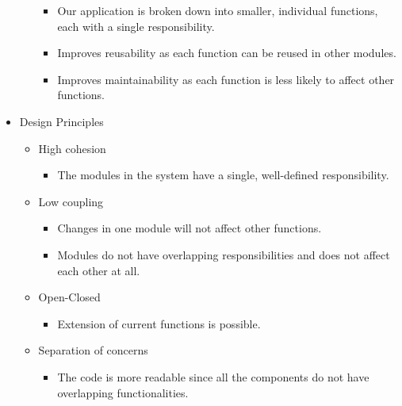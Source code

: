 \documentclass[a4paper]{scrreprt}
\begin{document}
\begin{itemize}
\begin{itemize}
\begin{itemize}
            \item Our application is broken down into smaller, individual functions, each with a single responsibility.
            \item Improves reusability as each function can be reused in other modules.
            \item Improves maintainability as each function is less likely to affect other functions.
        \end{itemize}
    \end{itemize}
    \item Design Principles
    \begin{itemize}
        \item High cohesion
        \begin{itemize}
            \item The modules in the system have a single, well-defined responsibility.
        \end{itemize}
        \item Low coupling
        \begin{itemize}
            \item Changes in one module will not affect other functions.
            \item Modules do not have overlapping responsibilities and does not affect each other at all.
        \end{itemize}
        \item Open-Closed
        \begin{itemize}
            \item Extension of current functions is possible.
        \end{itemize}
        \item Separation of concerns
        \begin{itemize}
            \item The code is more readable since all the components do not have overlapping functionalities.
        \end{itemize}
    \end{itemize}
\end{itemize}
\end{document}
